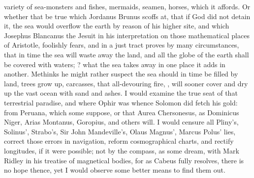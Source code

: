 {variety of sea-monsters and fishes, mermaids, seamen, horses, \etc{} which it affords. Or whether that be true which Jordanus Brunus scoffs at, that if God did not detain it, the sea would overflow the earth by reason of his higher site, and which Josephus Blancanus the Jesuit in his interpretation on those mathematical places of Aristotle, foolishly fears, and in a just tract proves by many circumstances, that in time the sea will waste away the land, and all the globe of the earth shall be covered with waters; ? what the sea takes away in one place it adds in another. Methinks he might rather suspect the sea should in time be filled by land, trees grow up, carcasses, \etc{} that all-devouring fire, , will sooner cover and dry up the vast ocean with sand and ashes. I would examine the true seat of that terrestrial paradise, and where Ophir was whence Solomon did fetch his gold: from Peruana, which some suppose, or that Aurea Chersonesus, as Dominicus Niger, Arias Montanus, Goropius, and others will. I would censure all Pliny's, Solinus', Strabo's, Sir John Mandeville's, Olaus Magnus', Marcus Polus' lies, correct those errors in navigation, reform cosmographical charts, and rectify longitudes, if it were possible; not by the compass, as some dream, with Mark Ridley in his treatise of magnetical bodies,  for as Cabeus  fully resolves, there is no hope thence, yet I would observe some better means to find them out.

}
